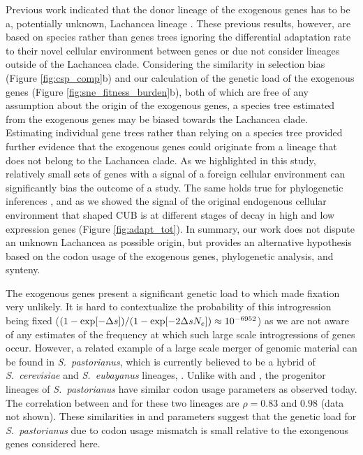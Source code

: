 \documentclass[fleqn,letterpaper]{article}
\begin{document}
Previous work indicated that the donor lineage of the exogenous genes has to be a, potentially unknown, Lachancea lineage \citep{payen2009, friedrich2015, vakirlis2016, brion2017}.
These previous results, however, are based on species rather than genes trees ignoring the differential adaptation rate to their novel cellular environment between genes or due not consider lineages outside of the Lachancea clade.
Considering the similarity in selection bias (Figure \ref{fig:csp_comp}b) and our calculation of the genetic load of the exogenous genes (Figure \ref{fig:sne_fitness_burden}b), both of which are free of any assumption about the origin of the exogenous genes, a species tree estimated from the exogenous genes may be biased towards the Lachancea clade.
Estimating individual gene trees rather than relying on a species tree provided further evidence that the exogenous genes could originate from a lineage that does not belong to the Lachancea clade.
As we highlighted in this study, relatively small sets of genes with a signal of a foreign cellular environment can significantly bias the outcome of a study. 
The same holds true for phylogenetic inferences \citep{salichos2013}, and as we showed the signal of the original endogenous cellular environment that shaped CUB is at different stages of decay in high and low expression genes (Figure \ref{fig:adapt_tot}).
In summary, our work does not dispute an unknown Lachancea as possible origin, but provides an alternative hypothesis based on the codon usage of the exogenous genes, phylogenetic analysis, and synteny.

The exogenous genes present a significant genetic load to \kluyveri which made fixation very unlikely.
It is hard to contextualize the probability of this introgression being fixed ($(1-\exp[-{\Delta s}])/(1-\exp[-2{\Delta s} N_e]) \approx 10^{-6952}$) as we are not aware of any estimates of the frequency at which such large scale introgressions of genes occur.
However, a related example of a large scale merger of genomic material can be found in \emph{S.~pastorianus}, which is currently believed to be a hybrid of \emph{S.~cerevisiae} and \emph{S.~eubayanus} lineages, \citep{baker2015}.
Unlike with \kluyveri and \gossypii, the  progenitor lineages of \emph{S.~pastorianus} have similar codon usage parameters as observed today.
The correlation between \DM and \DE for these two lineages are  $\rho = 0.83$ and  $0.98$ (data not shown).
These similarities in \DM and \DE parameters suggest that the genetic load for \emph{S.~pastorianus} due to codon usage mismatch is small relative to the exongenous genes considered here. 
\end{document}
